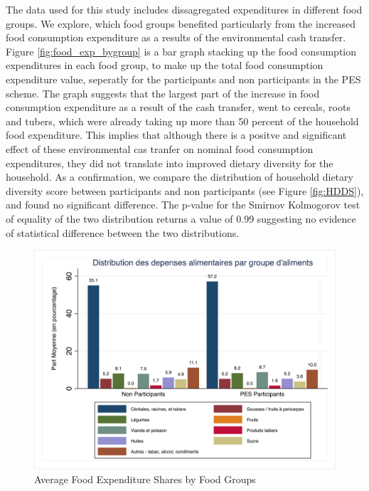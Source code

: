 \documentclass[preprint,12pt]{elsarticle}
\begin{document}
The data used for this study includes dissagregated expenditures in different food groups. We explore, which food groups benefited particularly from the increased food consumption expenditure as a results of the environmental cash transfer. Figure \ref{fig:food_exp_bygroup} is a bar graph stacking up the food consumption expenditures in each food group, to make up the total food consumption expenditure value, seperatly for the participants and non participants in the PES scheme. The graph suggests that the largest part of the increase in food consumption expenditure as a result of the cash transfer, went to cereals, roots and tubers, which were already taking up more than 50 percent of the household food expenditure. This implies that although there is a positve and significant effect of these environmental cas tranfer on nominal food consumption expenditures, they did not translate into improved dietary diversity for the household. As a confirmation, we compare the distribution of household dietary diversity score between participants and non participants (see Figure \ref{fig:HDDS}), and found no significant difference. The p-value for the Smirnov Kolmogorov test of equality of the two distribution returns a value of 0.99 suggesting no evidence of statistical difference between the two distributions.


\begin{figure}[t]
	\footnotesize
	\centering
	\caption{Average Food Expenditure Shares by Food Groups  \label{fig:food_exp_shares}}
	\includegraphics[width=0.9\linewidth]{FoodConsExpShr_byfoodgroup.png}
\end{figure}
\FloatBarrier
\end{document}
